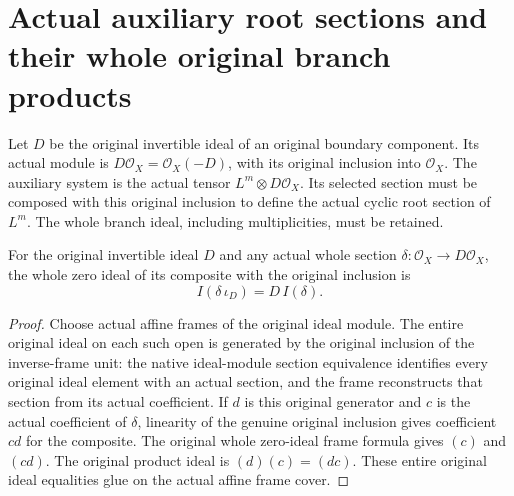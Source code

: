 \section{Actual auxiliary root sections and their whole original branch products}

Let $D$ be the original invertible ideal of an original boundary component.
Its actual module is $D\mathcal O_X=\mathcal O_X(-D)$, with its original
inclusion into $\mathcal O_X$. The auxiliary system is the actual tensor
$L^m\otimes D\mathcal O_X$. Its selected section must be composed with
this original inclusion to define the actual cyclic root section of
$L^m$. The whole branch ideal, including multiplicities, must be retained.

\begin{lemma}
\label{lem:kn-nadel-auxiliary-ideal-section-product}
\leanok
{}
For the original invertible ideal $D$ and any actual whole section
$\delta:\mathcal O_X\to D\mathcal O_X$, the whole zero ideal of its
composite with the original inclusion is
\[
 I(\delta\,\iota_D)=D\,I(\delta).
\]
\end{lemma}
\begin{proof}
Choose actual affine frames of the original ideal module. The entire
original ideal on each such open is generated by the original inclusion
of the inverse-frame unit: the native ideal-module section equivalence
identifies every original ideal element with an actual section, and the
frame reconstructs that section from its actual coefficient. If $d$ is
this original generator and $c$ is the actual coefficient of $\delta$,
linearity of the genuine original inclusion gives coefficient $cd$ for
the composite. The original whole zero-ideal frame formula gives $(c)$
and $(cd)$. The original product ideal is $(d)(c)=(dc)$. These entire
original ideal equalities glue on the actual affine frame cover.
\end{proof}

